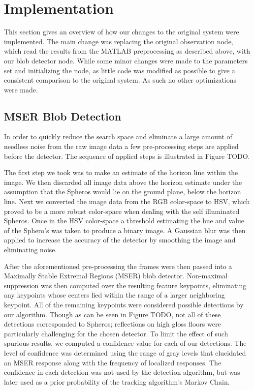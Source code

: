 \section{Implementation}
\label{sec:impl}

This section gives an overview of how our changes to the original system were implemented. The main change was replacing the
original observation node, which read the results from the MATLAB preprocessing as described above, with our blob detector
node. While some minor changes were made to the parameters set and initializing the node, as little code was modified as
possible to give a consistent comparison to the original system. As such no other optimizations were made.

\subsection{MSER Blob Detection}
In order to quickly reduce the search space and eliminate a large amount of needless noise from the raw image data a few
pre-processing steps are applied before the detector. The sequence of applied steps is illustrated in Figure TODO.

The first step we took was to make an estimate of the horizon line within the image. We then discarded all image data above the
horizon estimate under the assumption that the Spheros would lie on the ground plane, below the horizon line. Next we
converted the image data from the RGB color-space to HSV, which proved to be a more robust color-space when dealing with
the self illuminated Spheros. Once in the HSV color-space a threshold estimating the hue and value of the Sphero's was taken to
produce a binary image. A Gaussian blur was then applied to increase the accuracy of the detector by smoothing the image and
eliminating noise.

After the aforementioned pre-processing the frames were then passed into a Maximally Stable Extremal Regions (MSER) blob
detector. Non-maximal suppression was then computed over the resulting feature keypoints, eliminating any keypoints whose
centers lied within the range of a larger neighboring keypoint. All of the remaining keypoints were considered possible detections
by our algorithm. Though as can be seen in Figure TODO, not all of these detections corresponded to Spheros; reflections on
high gloss floors were particularly challenging for the chosen detector. To limit the effect of such spurious results, we computed a
confidence value for each of our detections. The level of confidence was determined using the range of gray levels that
elucidated an MSER response along with the frequency of localized responses. The confidence in each detection was not used
by the detection algorithm, but was later used as a prior probability of the tracking algorithm's Markov Chain.

